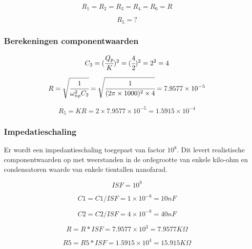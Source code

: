 \documentclass[]{article}
\begin{document}
\begin{equation*}
R_{1} = R_{2} = R_{3} = R_{4} = R_{6} = R
\end{equation*}

\begin{equation*}
R_{5} = ?
\end{equation*}

\subsubsection*{Berekeningen componentwaarden}

\begin{equation*}
C_{2} = (\cfrac{Q_{p}}{K})^{2} =  (\cfrac{4}{2})^{2} = 2^{2} = 4
\end{equation*}

\begin{equation*}
R = \sqrt{\cfrac{1}{\omega_{np}^{2}C_{2}}} = \sqrt{\cfrac{1}{(2\pi\times1000)^{2}\times4}} = 7.9577\times10^{-5}
\end{equation*}

\begin{equation*}
R_{5} = KR = 2 \times 7.9577\times10^{-5} = 1.5915\times10^{-4}
\end{equation*}

\subsubsection*{Impedatieschaling}

Er wordt een impedantieschaling toegepast van factor $10^{8}$. Dit levert realistische
componentwaarden op met weerstanden in de ordegrootte van enkele kilo-ohm en
condensatoren waarde van enkele tientallen nanofarad.

\begin{equation*}
	\boxed{ISF= 10^8}
\end{equation*}

\begin{equation*}
	C1 = C1/ISF = 1\times10^{-8} = 10nF
\end{equation*}

\begin{equation*}
	C2 = C2/ISF  = 4\times10^{-8} = 40nF
\end{equation*}

\begin{equation*}
	R  = R*ISF = 7.9577\times10^{3} = 7.9577K\Omega
\end{equation*}

\begin{equation*}
	R5 = R5*ISF = 1.5915\times10^{4} =15.915K\Omega
\end{equation*}
\end{document}
